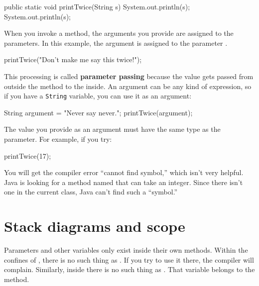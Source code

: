 \begin{code}
    public static void printTwice(String s) {
        System.out.println(s);
        System.out.println(s);
    }
\end{code}

When you invoke a method, the arguments you provide are assigned to the parameters.
In this example, the argument  is assigned to the parameter .

\begin{code}
    printTwice("Don't make me say this twice!");
\end{code}


This processing is called {\bf parameter passing} because the value gets passed from outside the method to the inside.
An argument can be any kind of expression, so if you have a {\tt String} variable, you can use it as an argument:

\begin{code}
    String argument = "Never say never.";
    printTwice(argument);
\end{code}

The value you provide as an argument must have the same type as the parameter.
For example, if you try:

\begin{code}
    printTwice(17);
\end{code}

You will get the compiler error ``cannot find symbol,'' which isn't very helpful.
Java is looking for a method named  that can take an integer.
Since there isn't one in the current class, Java can't find such a ``symbol.''



\section{Stack diagrams and scope}
\label{stack}


Parameters and other variables only exist inside their own methods.
Within the confines of , there is no such thing as .
If you try to use it there, the compiler will complain.
Similarly, inside  there is no such thing as .
That variable belongs to the  method.

